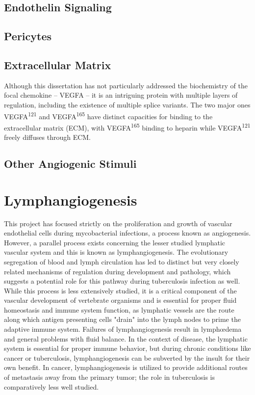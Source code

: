 \subsection{Endothelin Signaling}

\subsection{Pericytes}

\citep{Correa2014}
\citep{ClaessonWelsh2015}
\citep{Eklund2017}
\citep{Hato2008}
\citep{Sakamoto2010}
\citep{Keskin2015}
\citep{Shin2016}

\subsection{Extracellular Matrix}

Although this dissertation has not particularly addressed the biochemistry of the focal chemokine -- VEGFA -- it is an intriguing protein with multiple layers of regulation, including the existence of multiple splice variants. The two major ones VEGFA\textsuperscript{121} and VEGFA\textsuperscript{165} have distinct capacities for binding to the extracellular matrix (ECM), with VEGFA\textsuperscript{165} binding to heparin while VEGFA\textsuperscript{121} freely diffuses through ECM. 

\subsection{Other Angiogenic Stimuli}

\citep{Jeon2007, Liu2014, Sugden2017}

\section{Lymphangiogenesis}

This project has focused strictly on the proliferation and growth of vascular endothelial cells during mycobacterial infections, a process known as angiogenesis. However, a parallel process exists concerning the lesser studied lymphatic vascular system and this is known as lymphangiogenesis. The evolutionary segregation of blood and lymph circulation has led to distinct but very closely related mechanisms of regulation during development and pathology, which suggests a potential role for this pathway during tuberculosis infection as well. While this process is less extensively studied, it is a critical component of the vascular development of vertebrate organisms and is essential for proper fluid homeostasis and immune system function, as lymphatic vessels are the route along which antigen presenting cells "drain" into the lymph nodes to prime the adaptive immune system. Failures of lymphangiogenesis result in lymph\oe dema and general problems with fluid balance. In the context of disease, the lymphatic system is essential for proper immune behavior, but during chronic conditions like cancer or tuberculosis, lymphangiogenesis can be subverted by the insult for their own benefit. In cancer, lymphangiogenesis is utilized to provide additional routes of metastasis away from the primary tumor; the role in tuberculosis is comparatively less well studied.

